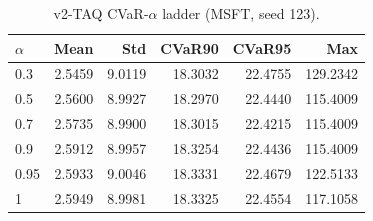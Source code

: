 \begin{table}[H]
    \centering
    \caption{v2-TAQ CVaR-$\alpha$ ladder (MSFT, seed 123).}
    \label{tab:v2_taq_alpha}
    \begin{tabular}{@{}lrrrrr@{}}
        \toprule
        $\alpha$ & Mean & Std & CVaR90 & CVaR95 & Max \\
        \midrule
        0.3 & 2.5459 & 9.0119 & 18.3032 & 22.4755 & 129.2342 \\
        0.5 & 2.5600 & 8.9927 & 18.2970 & 22.4440 & 115.4009 \\
        0.7 & 2.5735 & 8.9900 & 18.3015 & 22.4215 & 115.4009 \\
        0.9 & 2.5912 & 8.9957 & 18.3254 & 22.4436 & 115.4009 \\
        0.95 & 2.5933 & 9.0046 & 18.3331 & 22.4679 & 122.5133 \\
        1 & 2.5949 & 8.9981 & 18.3325 & 22.4554 & 117.1058 \\
        \bottomrule
    \end{tabular}
\end{table}
